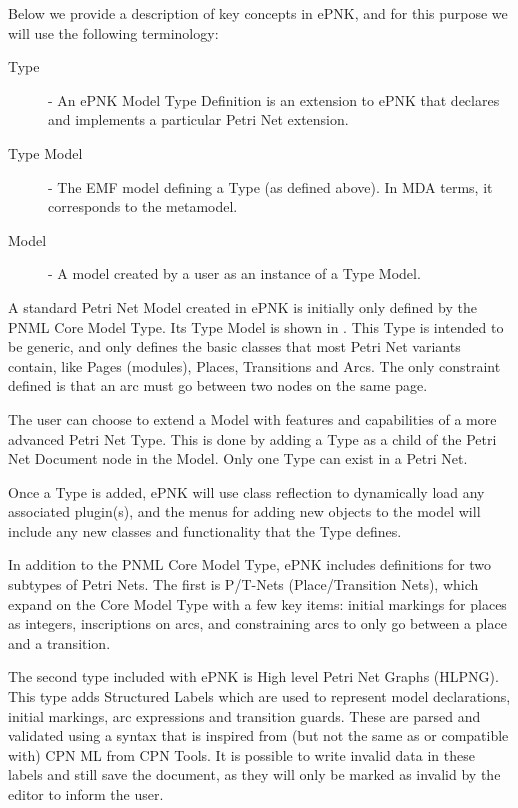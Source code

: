 Below we provide a description of key concepts in ePNK, and for this purpose we
will use the following terminology:
\begin{description}
	\item[Type] - An ePNK Model Type Definition is an extension to ePNK that
	declares and implements a particular Petri Net extension.
	\item[Type Model] - The EMF model defining a Type (as defined above). In MDA
	terms, it corresponds to the metamodel.
	\item[Model] - A model created by a user as an instance of a Type Model.
\end{description}
 
A standard Petri Net Model created in ePNK is initially only defined by the PNML
Core Model Type. Its Type Model is shown in . This Type is
intended to be generic, and only defines the basic classes that most Petri Net variants
contain, like Pages (modules), Places, Transitions and Arcs. The only constraint
defined is that an arc must go between two nodes on the same page.

The user can choose to extend a Model with features and capabilities of a more 
advanced Petri Net Type. This is done by adding a Type as a child of the Petri Net
Document node in the Model. Only one Type can exist in a Petri Net.

Once a Type is added, ePNK will use class reflection to dynamically load
any associated plugin(s), and the menus for adding new objects to the model will
include any new classes and functionality that the Type defines.

In addition to the PNML Core Model Type, ePNK includes definitions for
two subtypes of Petri Nets. The first is P/T-Nets (Place/Transition Nets), which
expand on the Core Model Type with a few key items: initial markings for places
as integers, inscriptions on arcs, and constraining arcs to only go between a place
and a transition.

The second type included with ePNK is High level Petri Net Graphs (HLPNG). This
type adds Structured Labels which are used to represent model declarations, initial
markings, arc expressions and transition guards. These are parsed and validated
using a syntax that is inspired from (but not the same as or compatible with)
CPN ML from CPN Tools. It is possible to write invalid data in these labels
and still save the document, as they will only be marked as invalid by the
editor to inform the user.

